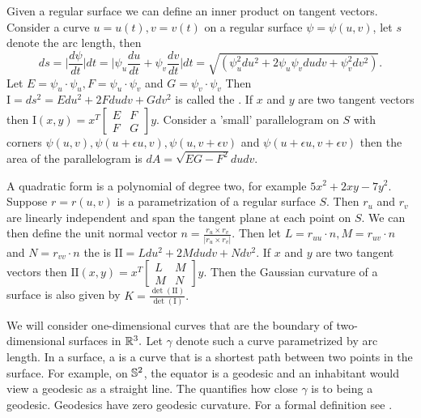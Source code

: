 Given a regular surface we can define an inner product on tangent vectors.
Consider a curve $u=u(t), v=v(t)$ on a regular surface $\psi=\psi(u,v)$, let
$s$ denote the arc length, then 
$$ds=\bigg | \frac{d\psi}{dt}\bigg | dt = \bigg | \psi_u\frac{du}{dt}+\psi_v\frac{dv}{dt}\bigg |dt
=\sqrt{(\psi_u^2 du^2+2\psi_u\psi_v du dv + \psi_v^2dv^2)}.$$
Let $E=\psi_u\cdot \psi_u, F=\psi_u\cdot \psi_v$ and  $G=\psi_v\cdot \psi_v$
Then $\mathrm{I}=ds^2=Edu^2+2Fdudv +Gdv^2$ is called the .
If $x$ and $y$ are two tangent vectors
then $\mathrm{I}(x,y)=x^T\begin{bmatrix}
E & F \\
F & G 
\end{bmatrix}y.$
Consider a 'small' parallelogram on $S$ with corners $\psi(u,v),\psi(u+\epsilon u, v), \psi(u,v+\epsilon v)$ 
and $\psi(u+\epsilon u, v+\epsilon v)$ then the area of the parallelogram is
$dA=\sqrt{EG-F^2}dudv.$


A quadratic form is a polynomial of degree two, for example $5x^2+2xy-7y^2$.
Suppose $r=r(u,v)$ is a parametrization of a regular surface $S$.
Then $r_u$ and $r_v$ are linearly independent and span the tangent plane at each point
on $S$. We can then define the unit normal vector $n=\frac{r_u\times r_v}{|r_u\times r_v|}$.
Then let $L=r_{uu}\cdot n, M=r_{uv}\cdot n$ and $N=r_{vv}\cdot n$ the
 is $\mathrm{I\!I}=Ldu^2+2Mdudv+Ndv^2$.
If $x$ and $y$ are two tangent vectors
then $\mathrm{I\!I}(x,y)=x^T\begin{bmatrix}
L & M \\
M & N 
\end{bmatrix}y.$
Then the Gaussian curvature of a surface is also given by
$K=\frac{\det(\mathrm{I\!I})}{\det(\mathrm{I})}.$



We will consider one-dimensional curves that are the boundary of two-dimensional
surfaces in $\mathbb{R}^3.$ Let $\gamma$ denote such a curve parametrized by arc length.
In a surface, a  is a curve that is a shortest path
between two points in the surface. 
For example, on $\mathbb{S}^2$, the equator is a geodesic
and an inhabitant would view a geodesic as a straight line. 
The  quantifies how close $\gamma$ is to being a geodesic.
Geodesics have zero geodesic curvature. 
For a formal definition see \cite{doc76}.



